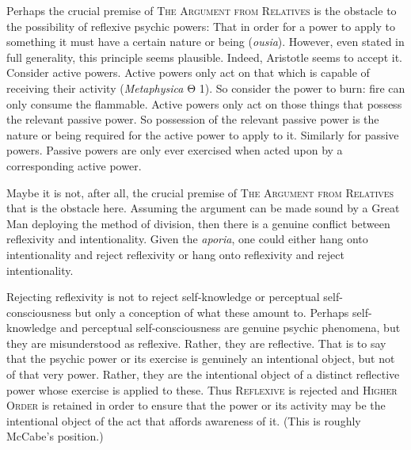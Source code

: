 Perhaps the crucial premise of \textsc{The Argument from Relatives} is the obstacle to the possibility of reflexive psychic powers: That in order for a power to apply to something it must have a certain nature or being (\emph{ousia}). However, even stated in full generality, this principle seems plausible. Indeed, Aristotle seems to accept it. Consider active powers. Active powers only act on that which is capable of receiving their activity (\emph{Metaphysica} {\sbl Θ} 1). So consider the power to burn: fire can only consume the flammable. Active powers only act on those things that possess the relevant passive power. So possession of the relevant passive power is the nature or being required for the active power to apply to it. Similarly for passive powers. Passive powers are only ever exercised when acted upon by a corresponding active power.


Maybe it is not, after all, the crucial premise of \textsc{The Argument from Relatives} that is the obstacle here. Assuming the argument can be made sound by a Great Man deploying the method of division, then there is a genuine conflict between reflexivity and intentionality. Given the \emph{aporia}, one could either hang onto intentionality and reject reflexivity or hang onto reflexivity and reject intentionality.

Rejecting reflexivity is not to reject self-knowledge or perceptual self-conscious\-ness but only a conception of what these amount to. Perhaps self-knowledge and perceptual self-consciousness are genuine psychic phenomena, but they are misunderstood as reflexive. Rather, they are reflective. That is to say that the psychic power or its exercise is genuinely an intentional object, but not of that very power. Rather, they are the intentional object of a distinct reflective power whose exercise is applied to these. Thus \textsc{Reflexive} is rejected and \textsc{Higher Order} is retained in order to ensure that the power or its activity may be the intentional object of the act that affords awareness of it. (This is roughly McCabe's \citeyear{McCabe:2007ss} position.)

